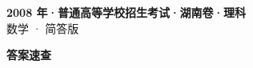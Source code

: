 \documentclass[zihao=-4, a4paper]{ctexart}
\begin{document}
\begin{center}
  {\Large\bfseries 2008 年·普通高等学校招生考试·湖南卷·理科}\\[4pt]
  {\large 数学 · 简答版}
\end{center}
\medskip
{}

\clearpage
{}
\begin{center}{\Large\bfseries 答案速查}\end{center}
\medskip

\end{document}
